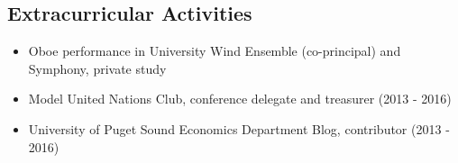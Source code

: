 \documentclass[letter]{res}
\begin{document}
\begin{resume}
\section{Extracurricular Activities}
\begin{itemize}
	\item Oboe performance in University Wind Ensemble (co-principal) and Symphony, private study
    \item Model United Nations Club, conference delegate and treasurer (2013 - 2016)
    \item University of Puget Sound Economics Department Blog, contributor (2013 - 2016)
\end{itemize}
% 
% 
% 

\end{resume}
\end{document}

